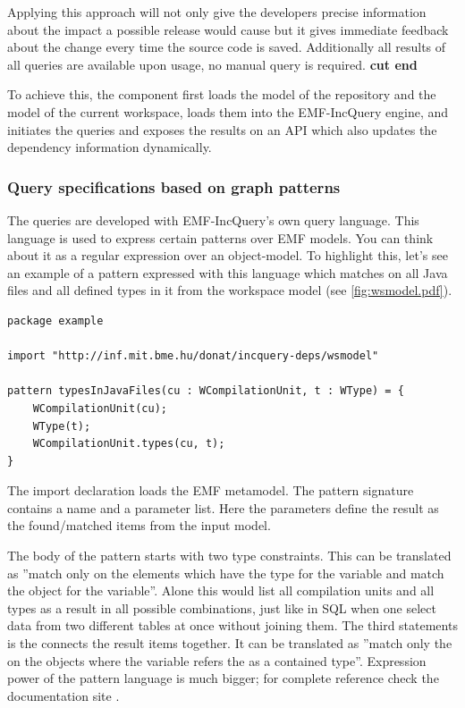 Applying this approach will not only give the developers precise information
about the impact a possible release would cause but it gives immediate feedback
about the change every time the source code is saved. Additionally all 
results of all queries are available upon usage, no manual query is required.
\textbf{cut end}

To achieve this, the component first loads the model of the repository and the 
model of the current workspace, loads them into the EMF-IncQuery engine, 
and initiates the queries and exposes the results on an API which also updates
the dependency information dynamically.
 
\subsubsection{Query specifications based on graph patterns}
The queries are developed with EMF-IncQuery's own query language. This language
is used to express certain patterns over EMF models. You can think about it as 
a regular expression over an object-model. To highlight this, let's see an example
of a pattern expressed with this language which matches on all Java files and
all defined types in it from the workspace model (see \autoref{fig:wsmodel.pdf}). 
\begin{lstlisting}
package example

import "http://inf.mit.bme.hu/donat/incquery-deps/wsmodel"

pattern typesInJavaFiles(cu : WCompilationUnit, t : WType) = {
	WCompilationUnit(cu);
	WType(t);
	WCompilationUnit.types(cu, t);
}
\end{lstlisting}

The import declaration loads the EMF metamodel. The pattern signature
contains a name and a parameter list. Here the parameters define the result as
the found/matched items from the input model. 

The body of the pattern starts with two type constraints. This can be translated
as ''match only on the elements which have the  type for
the  variable and match the  object for the 
variable''. Alone this would list all compilation units and all types as a
result in all possible combinations, just like in SQL when one select data from
two different tables at once without joining them. The third statements is the
connects the result items together. It can be translated as ''match only the on
the objects  where the  variable refers the  as a contained
type''. Expression power of the pattern language is much bigger; for complete
reference check the documentation site \cite{EMFIncQuery}.

